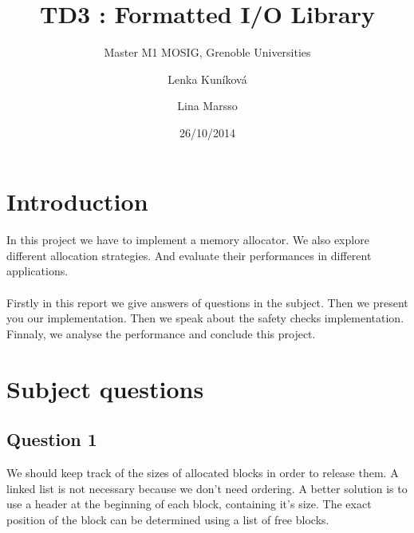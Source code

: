 \documentclass[a4paper,10pt]{article}
\title{TD3 : Formatted I/O Library}
\subtitle{Master M1 MOSIG, Grenoble Universities}
\author{Lenka Kun\'{i}kov\'{a} \and Lina Marsso}
\date{26/10/2014}
\begin{document}


\maketitle



\section{Introduction}
	\paragraph{}
	In this project we have to implement a memory allocator. 
	We also explore different allocation strategies.
	And evaluate their performances in different applications.
	\paragraph{}
	Firstly in this report we give answers of questions in the subject. 
	Then we present you our implementation.
	Then we speak about the safety checks implementation. 
	Finnaly, we analyse the performance and conclude this project.

\section{Subject questions}
\subsection{Question 1}
We should keep track of the sizes of allocated blocks in order to
release them. A linked list is not necessary because we don’t need ordering.
A better solution is to use a header at the beginning of each block, 
containing it's size. The exact position of the block can be determined using a
list of free blocks.
\end{document}
